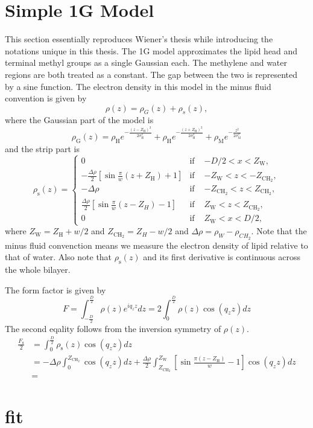 \documentclass[12pt,letterpaper]{article}
\newcommand{\zw}{Z_\mathrm{W}}
\newcommand{\zch}{Z_\mathrm{CH_2}}
\newcommand{\zh}{Z_\mathrm{H}}
\newcommand{\sigmah}{\sigma_\mathrm{H}}
\newcommand{\sigmam}{\sigma_\mathrm{M}}
\newcommand{\rhoh}{\rho_\mathrm{H}}
\newcommand{\rhom}{\rho_\mathrm{M}}
\begin{document}
\section{Simple 1G Model}
This section essentially reproduces Wiener's thesis while introducing the 
notations unique in this thesis. The 1G model approximates the lipid head 
and terminal methyl groups as a single 
Gaussian each. The methylene and water regions are both treated as a constant.
The gap between the two is represented by a sine function. The electron
density in this model in the minus fluid convention is given by
\begin{equation}
  \rho(z) = \rho_{G}(z) + \rho_{s}(z),
\end{equation}
where the Gaussian part of the model is 
\begin{equation}
  \rho_{\mathrm{G}}(z) = \rhoh e^{-\frac{(z-\zh)^2}{2\sigmah^2}} + 
                \rhoh e^{-\frac{(z+\zh)^2}{2\sigmah^2}} + 
                \rhom e^{-\frac{z^2}{2\sigmam^2}}
\end{equation}
and the strip part is
\begin{equation}
\rho_\mathrm{s}(z) = \left\{
  \begin{array}{ccc}
    0 & \text{if } & -D/2 < x < \zw,\\
    -\frac{\Delta\rho}{2} \left[\sin\frac{\pi}{w}(z+\zh)+1\right] & \text{if } & -\zw < z < -\zch,\\
    -\Delta\rho & \text{if } & -\zch < z < \zch,\\
    \frac{\Delta\rho}{2} \left[\sin\frac{\pi}{w}(z-Z_H)-1\right] & \text{if } & \zw < z < \zch,\\
    0 & \text{if } & \zw < x < D/2,
  \end{array} \right.
\end{equation}
where $Z_\mathrm{W}=Z_\mathrm{H}+w/2$ and $Z_{\mathrm{CH_2}}=Z_H-w/2$ and $\Delta\rho=\rho_W-\rho_{CH_2}$. 
Note that the minus fluid convenction means we measure the electron density 
of lipid relative to that of water. Also note that $\rho_\mathrm{s}(z)$ and its first 
derivative is continuous across the whole bilayer.

The form factor is given by
\begin{equation}
  F = \int_{-\frac{D}{2}}^{\frac{D}{2}} \rho(z) e^{iq_zz} dz 
    = 2 \int_0^{\frac{D}{2}} \rho(z) \cos (q_zz) dz
\end{equation}
The second eqality follows from the inversion symmetry of $\rho(z)$. 
\begin{align}
  \frac{F_\mathrm{s}}{2} &= \int_0^{\frac{D}{2}} \rho_\mathrm{s}(z) \cos (q_zz) dz \nonumber\\
                &= -\Delta\rho \int_0^{\zch} \cos(q_zz) dz 
                   + \frac{\Delta\rho}{2} \int_{\zch}^{\zw} \left[\sin\frac{\pi(z-\zh)}{w}-1\right] \cos(q_zz) dz \nonumber\\
                &=
\end{align}

\section{fit}
\end{document}
